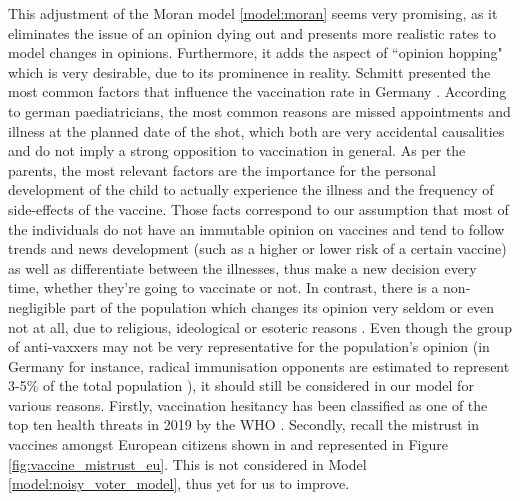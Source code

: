 \documentclass[12pt,a4paper,twoside]{article}
\begin{document}
This adjustment of the Moran model \eqref{model:moran} seems very promising, as it eliminates the issue of an opinion dying out and presents more realistic rates to model changes in opinions. Furthermore, it adds the aspect of ``opinion hopping" which is very desirable, due to its prominence in reality. Schmitt presented the most common factors that influence the vaccination rate in Germany \cite{Schmitt2001}. According to german paediatricians, the most common reasons are missed appointments and illness at the planned date of  the shot, which both are very accidental causalities and do not imply a strong opposition to vaccination in general. As per the parents, the most relevant factors are the importance for the personal development of the child to actually experience the illness and the frequency of side-effects of the vaccine. Those facts correspond to our assumption that most of the individuals do not have an immutable opinion on vaccines and tend to follow trends and news development (such as a higher or lower risk of a certain vaccine) as well as differentiate between the illnesses, thus make a new decision every time, whether they're going to vaccinate or not. In contrast, there is a non-negligible part of the population which changes its opinion very seldom or even not at all, due to religious, ideological or esoteric reasons \cite{Novotny1988, Bednarz2020, Health2019}. Even though the group of anti-vaxxers may not be very representative for the population's opinion (in Germany for instance, radical immunisation opponents are estimated to represent 3-5\% of the total population \cite{Meyer2004, HorstkotterNMullerUOmmenOPlatteAReckendreesBStanderVLangPThaissH2017, HorstkotterNMullerUOmmenOPlatteAReckendreesBStanderVLangPThaissH2018}), it should still be considered in our model for various reasons. Firstly, vaccination hesitancy has been classified as one of the top ten health threats in 2019 by the \ac{WHO} \cite{WHOAkbar2019}. Secondly, recall the mistrust in vaccines amongst European citizens shown in \cite{KantarBelgium2019} and represented in Figure \ref{fig:vaccine_mistrust_eu}. This is not considered in Model \ref{model:noisy_voter_model}, thus yet for us to improve.
\end{document}
